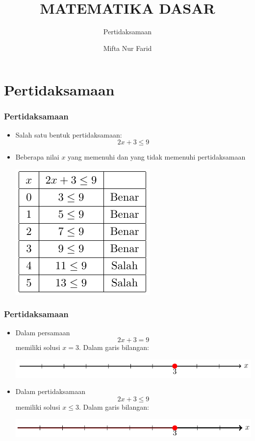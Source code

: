 \documentclass[pdflatex,compress,mathserif]{beamer}
\title{MATEMATIKA DASAR}
\subtitle{Pertidaksamaan}
\author{Mifta Nur Farid}
\begin{document}
\maketitle

\section{Pertidaksamaan}

\begin{frame}
	\frametitle{Pertidaksamaan}
	\begin{itemize}
		\item Salah satu bentuk pertidaksamaan:
		$$ 2x+3 \leq 9 $$
		\item Beberapa nilai $x$ yang memenuhi dan yang tidak memenuhi pertidaksamaan
		\begin{center}
			\includegraphics[width=0.4\linewidth]{img/img01}
		\end{center}
	\end{itemize}
\end{frame}

\begin{frame}
	\frametitle{Pertidaksamaan}
	\begin{itemize}
		\item Dalam persamaan $$ 2x+3 = 9 $$ memiliki solusi $x = 3$. Dalam garis bilangan:
		\begin{center}
			\includegraphics[width=\linewidth]{img/img02}
		\end{center}
		\item Dalam pertidaksamaan $$ 2x+3 \leq 9 $$ memiliki solusi $x \leq 3$. Dalam garis bilangan:
		\begin{center}
			\includegraphics[width=\linewidth]{img/img03}
		\end{center}
	\end{itemize}
\end{frame}
\end{document}
